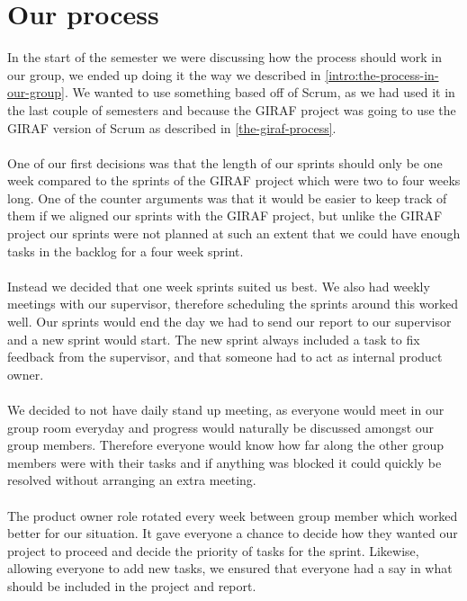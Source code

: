 \section{Our process}
In the start of the semester we were discussing how the process should work in our group, we ended up doing it the way we described in \autoref{intro:the-process-in-our-group}.
We wanted to use something based off of Scrum, as we had used it in the last couple of semesters and because the GIRAF project was going to use the GIRAF version of Scrum as described in \autoref{the-giraf-process}.
\\\\
One of our first decisions was that the length of our sprints should only be one week compared to the sprints of the GIRAF project which were two to four weeks long.
One of the counter arguments was that it would be easier to keep track of them if we aligned our sprints with the GIRAF project, but unlike the GIRAF project our sprints were not planned at such an extent that we could have enough tasks in the backlog for a four week sprint.
\\\\
Instead we decided that one week sprints suited us best.
We also had weekly meetings with our supervisor, therefore scheduling the sprints around this worked well.
Our sprints would end the day we had to send our report to our supervisor and a new sprint would start.
The new sprint always included a task to fix feedback from the supervisor, and that someone had to act as internal product owner.
\\\\
We decided to not have daily stand up meeting, as everyone would meet in our group room everyday and progress would naturally be discussed amongst our group members.
Therefore everyone would know how far along the other group members were with their tasks and if anything was blocked it could quickly be resolved without arranging an extra meeting.
\\\\
The product owner role rotated every week between group member which worked better for our situation. 
It gave everyone a chance to decide how they wanted our project to proceed and decide the priority of tasks for the sprint.
Likewise, allowing everyone to add new tasks, we ensured that everyone had a say in what should be included in the project and report.
